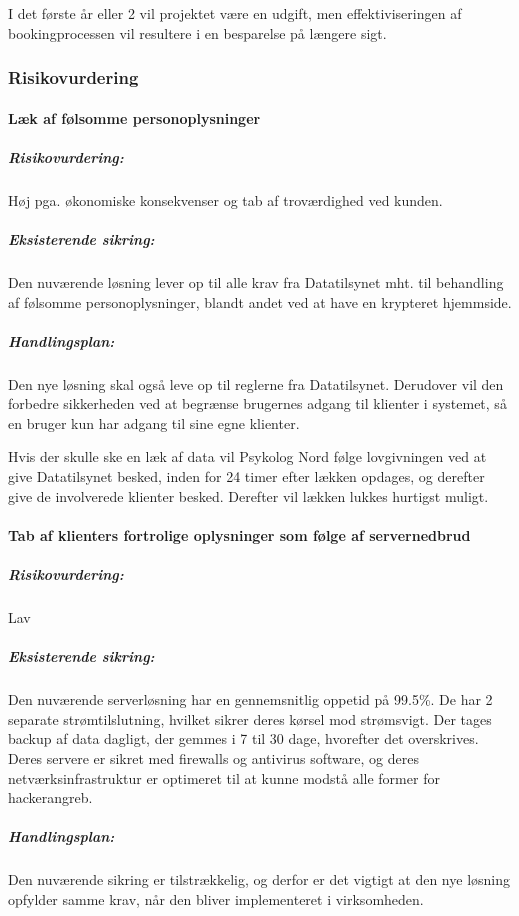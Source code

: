 I det første år eller 2 vil projektet være en udgift, men effektiviseringen af bookingprocessen vil resultere i en besparelse på længere sigt.

\subsubsection{Risikovurdering}

\paragraph*{Læk af følsomme personoplysninger}

\subparagraph{Risikovurdering:}
Høj pga. økonomiske konsekvenser og tab af troværdighed ved kunden.
    
\subparagraph{Eksisterende sikring:}
Den nuværende løsning lever op  til alle krav fra Datatilsynet mht. til behandling af følsomme personoplysninger, blandt andet ved at have en krypteret hjemmside.\cite{terapeutbookingsikkerhed}
    
\subparagraph{Handlingsplan:}
Den nye løsning skal også leve op til reglerne fra Datatilsynet. Derudover vil den forbedre sikkerheden ved at begrænse brugernes adgang til klienter i systemet, så en bruger kun har adgang til sine egne klienter.
    
Hvis der skulle ske en læk af data vil Psykolog Nord følge lovgivningen ved at give Datatilsynet besked, inden for 24 timer efter lækken opdages, og derefter give de involverede klienter besked. Derefter vil lækken lukkes hurtigst muligt.
    
\paragraph*{Tab af klienters fortrolige oplysninger som følge af servernedbrud}

\subparagraph{Risikovurdering:}
Lav
    
\subparagraph{Eksisterende sikring:}
Den nuværende serverløsning har en gennemsnitlig oppetid på 99.5\%. De har 2 separate strømtilslutning, hvilket sikrer deres kørsel mod strømsvigt. Der tages backup af data dagligt, der gemmes i 7 til 30 dage, hvorefter det overskrives. Deres servere er sikret med firewalls og antivirus software, og deres netværksinfrastruktur er optimeret til at kunne modstå alle former for hackerangreb.\cite{terapeutbookingdata}

\subparagraph{Handlingsplan:}
Den nuværende sikring er tilstrækkelig, og derfor er det vigtigt at den nye løsning opfylder samme krav, når den bliver implementeret i virksomheden.

